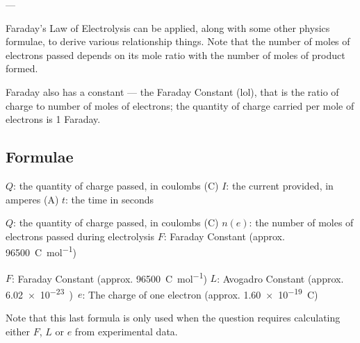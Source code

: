			--- 

			Faraday's Law of Electrolysis can be applied, along with some other physics formulae, to derive various relationship things. Note
			that the number of moles of electrons passed depends on its mole ratio with the number of moles of product formed.

			Faraday also has a constant --- the Faraday Constant (lol), that is the ratio of charge to number of moles of electrons; the
			quantity of charge carried per mole of electrons is 1 Faraday.



		\subsection{Formulae}


			\tabto{0mm}$Q$: \tabto{10mm}the quantity of charge passed, in coulombs (\si{\coulomb})
			\tabto{0mm}$I$: \tabto{10mm}the current provided, in amperes (\si{\ampere})
			\tabto{0mm}$t$:	\tabto{10mm}the time in seconds

			\vspace{1em}



			\tabto{0mm}$Q$:		\tabto{10mm}the quantity of charge passed, in coulombs (\si{\coulomb})
			\tabto{0mm}$n(e)$:	\tabto{10mm}the number of moles of electrons passed during electrolysis
			\tabto{0mm}$F$:		\tabto{10mm}Faraday Constant (approx. \SI{96500}{\coulomb\per\mole})

			\vspace{1em}



			\tabto{0mm}$F$:		\tabto{10mm}Faraday Constant (approx. \SI{96500}{\coulomb\per\mole})
			\tabto{0mm}$L$:		\tabto{10mm}Avogadro Constant (approx. \SI{6.02e-23})
			\tabto{0mm}$e$:		\tabto{10mm}The charge of one electron (approx. \SI{1.60e-19}{\coulomb})


			Note that this last formula is only used when the question requires calculating either $F$, $L$ or $e$ from experimental data.



